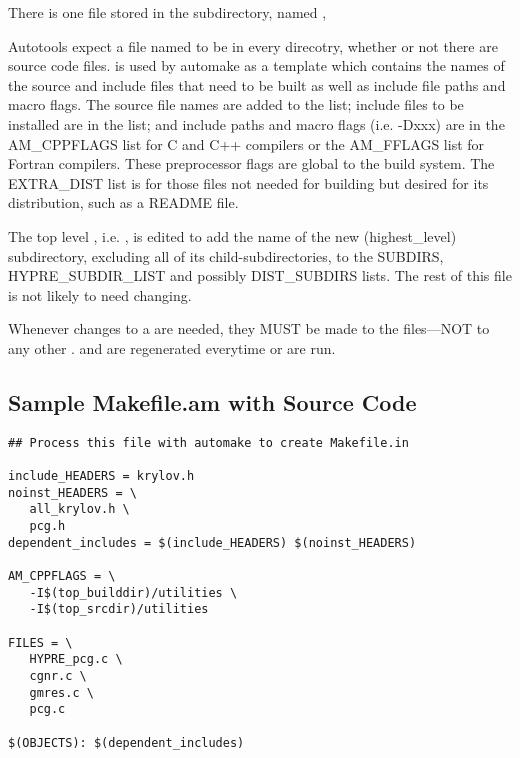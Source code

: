 There is one file stored in the  subdirectory, named ,



Autotools expect a file named  to be in every direcotry, whether
or not there are source code files.   is used by automake as a
template which contains the names of the source and include files that need to 
be built as well as include file paths and macro flags.  The source file names 
are added to the  list; include files to be installed are in the 
 list; and include paths and macro flags (i.e. -Dxxx) are 
in the AM\_CPPFLAGS list for C and C++ compilers or the AM\_FFLAGS list for Fortran
compilers.  These preprocessor flags are global to the build system.  The 
EXTRA\_DIST list is for those files not needed for building \hypre{} but desired 
for its distribution, such as a README file. 

The top level , i.e. , is 
edited to add the name of the new (highest\_level) subdirectory, excluding all of
its child-subdirectories, to the SUBDIRS, HYPRE\_SUBDIR\_LIST and possibly 
DIST\_SUBDIRS lists.  The rest of this file is not likely to need changing.

Whenever changes to a  are needed, they MUST be made to the 
files---NOT to any other .
 and  are regenerated everytime 
or  are run.

\subsection{Sample Makefile.am with Source Code}
\label{Sample Makefile.am with Source Code}

\begin{verbatim}
## Process this file with automake to create Makefile.in

include_HEADERS = krylov.h
noinst_HEADERS = \
   all_krylov.h \
   pcg.h
dependent_includes = $(include_HEADERS) $(noinst_HEADERS)

AM_CPPFLAGS = \
   -I$(top_builddir)/utilities \
   -I$(top_srcdir)/utilities 

FILES = \
   HYPRE_pcg.c \
   cgnr.c \
   gmres.c \
   pcg.c

$(OBJECTS): $(dependent_includes)

\end{verbatim}

